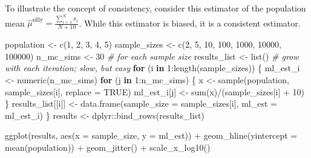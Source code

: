 \documentclass[
]{book}
\newenvironment{Shaded}{\begin{snugshade}}{\end{snugshade}}
\newcommand{\AttributeTok}[1]{\textcolor[rgb]{0.77,0.63,0.00}{#1}}
\newcommand{\CommentTok}[1]{\textcolor[rgb]{0.56,0.35,0.01}{\textit{#1}}}
\newcommand{\ConstantTok}[1]{\textcolor[rgb]{0.00,0.00,0.00}{#1}}
\newcommand{\ControlFlowTok}[1]{\textcolor[rgb]{0.13,0.29,0.53}{\textbf{#1}}}
\newcommand{\DecValTok}[1]{\textcolor[rgb]{0.00,0.00,0.81}{#1}}
\newcommand{\FunctionTok}[1]{\textcolor[rgb]{0.00,0.00,0.00}{#1}}
\newcommand{\NormalTok}[1]{#1}
\newcommand{\OtherTok}[1]{\textcolor[rgb]{0.56,0.35,0.01}{#1}}
\newcommand{\SpecialCharTok}[1]{\textcolor[rgb]{0.00,0.00,0.00}{#1}}
\begin{document}
To illustrate the concept of consistency, consider this estimator of the
population mean
\(\hat{\mu}^{\text{silly}} = \frac{\sum_{i = 1}^N x_i}{N + 10}\). While
this estimator is biased, it is a consistent estimator.

\begin{Shaded}
\begin{Highlighting}[]
\NormalTok{population }\OtherTok{\textless{}{-}} \FunctionTok{c}\NormalTok{(}\DecValTok{1}\NormalTok{, }\DecValTok{2}\NormalTok{, }\DecValTok{3}\NormalTok{, }\DecValTok{4}\NormalTok{, }\DecValTok{5}\NormalTok{)}
\NormalTok{sample\_sizes }\OtherTok{\textless{}{-}} \FunctionTok{c}\NormalTok{(}\DecValTok{2}\NormalTok{, }\DecValTok{5}\NormalTok{, }\DecValTok{10}\NormalTok{, }\DecValTok{100}\NormalTok{, }\DecValTok{1000}\NormalTok{, }\DecValTok{10000}\NormalTok{, }\DecValTok{100000}\NormalTok{)}
\NormalTok{n\_mc\_sims }\OtherTok{\textless{}{-}} \DecValTok{30}  \CommentTok{\# for each sample size}
\NormalTok{results\_list }\OtherTok{\textless{}{-}} \FunctionTok{list}\NormalTok{()  }\CommentTok{\# grow with each iteration; slow, but easy}
\ControlFlowTok{for}\NormalTok{ (i }\ControlFlowTok{in} \DecValTok{1}\SpecialCharTok{:}\FunctionTok{length}\NormalTok{(sample\_sizes)) \{}
\NormalTok{  ml\_est\_i }\OtherTok{\textless{}{-}} \FunctionTok{numeric}\NormalTok{(n\_mc\_sims)}
  \ControlFlowTok{for}\NormalTok{ (j }\ControlFlowTok{in} \DecValTok{1}\SpecialCharTok{:}\NormalTok{n\_mc\_sims) \{}
\NormalTok{    x }\OtherTok{\textless{}{-}} \FunctionTok{sample}\NormalTok{(population, sample\_sizes[i], }\AttributeTok{replace =} \ConstantTok{TRUE}\NormalTok{)}
\NormalTok{    ml\_est\_i[j] }\OtherTok{\textless{}{-}} \FunctionTok{sum}\NormalTok{(x)}\SpecialCharTok{/}\NormalTok{(sample\_sizes[i] }\SpecialCharTok{+} \DecValTok{10}\NormalTok{)}
\NormalTok{  \}}
\NormalTok{  results\_list[[i]] }\OtherTok{\textless{}{-}} \FunctionTok{data.frame}\NormalTok{(}\AttributeTok{sample\_size =}\NormalTok{ sample\_sizes[i],}
                             \AttributeTok{ml\_est =}\NormalTok{ ml\_est\_i)}
\NormalTok{\}}
\NormalTok{results }\OtherTok{\textless{}{-}}\NormalTok{ dplyr}\SpecialCharTok{::}\FunctionTok{bind\_rows}\NormalTok{(results\_list) }

\FunctionTok{ggplot}\NormalTok{(results, }\FunctionTok{aes}\NormalTok{(}\AttributeTok{x =}\NormalTok{ sample\_size, }\AttributeTok{y =}\NormalTok{ ml\_est)) }\SpecialCharTok{+} 
  \FunctionTok{geom\_hline}\NormalTok{(}\AttributeTok{yintercept =} \FunctionTok{mean}\NormalTok{(population)) }\SpecialCharTok{+} 
  \FunctionTok{geom\_jitter}\NormalTok{() }\SpecialCharTok{+} 
  \FunctionTok{scale\_x\_log10}\NormalTok{()}
\end{Highlighting}
\end{Shaded}
\end{document}

